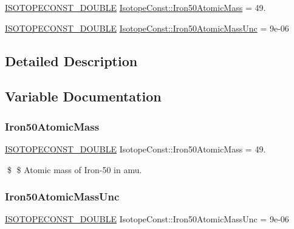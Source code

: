 \begin{DoxyCompactItemize}
\item 
\mbox{\hyperlink{group___isotope_const-_macros_ga8f45a7272ce02c0b4c65c44636ed719a}{I\+S\+O\+T\+O\+P\+E\+C\+O\+N\+S\+T\+\_\+\+D\+O\+U\+B\+LE}} \mbox{\hyperlink{group___isotope_const-_iron-_fe50_ga4ec060da40f39ff28a022762340b6840}{Isotope\+Const\+::\+Iron50\+Atomic\+Mass}} = 49.
\item 
\mbox{\hyperlink{group___isotope_const-_macros_ga8f45a7272ce02c0b4c65c44636ed719a}{I\+S\+O\+T\+O\+P\+E\+C\+O\+N\+S\+T\+\_\+\+D\+O\+U\+B\+LE}} \mbox{\hyperlink{group___isotope_const-_iron-_fe50_ga26ac2892d092c69e54af18ce8066db5e}{Isotope\+Const\+::\+Iron50\+Atomic\+Mass\+Unc}} = 9e-\/06
\end{DoxyCompactItemize}


\subsection{Detailed Description}


\subsection{Variable Documentation}
\mbox{\label{group___isotope_const-_iron-_fe50_ga4ec060da40f39ff28a022762340b6840}} 
\subsubsection{\texorpdfstring{Iron50\+Atomic\+Mass}{Iron50AtomicMass}}
{\footnotesize\ttfamily \mbox{\hyperlink{group___isotope_const-_macros_ga8f45a7272ce02c0b4c65c44636ed719a}{I\+S\+O\+T\+O\+P\+E\+C\+O\+N\+S\+T\+\_\+\+D\+O\+U\+B\+LE}} Isotope\+Const\+::\+Iron50\+Atomic\+Mass = 49.}

\$ \$ Atomic mass of Iron-\/50 in amu. \mbox{\label{group___isotope_const-_iron-_fe50_ga26ac2892d092c69e54af18ce8066db5e}} 
\subsubsection{\texorpdfstring{Iron50\+Atomic\+Mass\+Unc}{Iron50AtomicMassUnc}}
{\footnotesize\ttfamily \mbox{\hyperlink{group___isotope_const-_macros_ga8f45a7272ce02c0b4c65c44636ed719a}{I\+S\+O\+T\+O\+P\+E\+C\+O\+N\+S\+T\+\_\+\+D\+O\+U\+B\+LE}} Isotope\+Const\+::\+Iron50\+Atomic\+Mass\+Unc = 9e-\/06}

